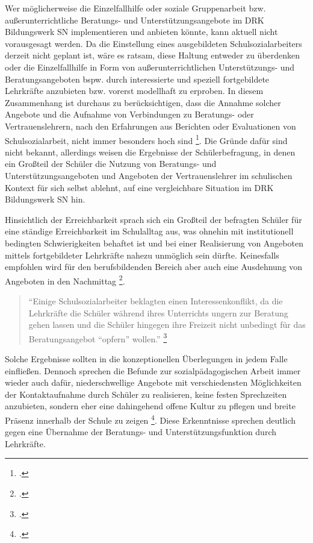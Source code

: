 Wer möglicherweise die Einzelfallhilfe oder soziale Gruppenarbeit bzw. außerunterrichtliche Beratungs- und Unterstützungsangebote im DRK Bildungswerk SN implementieren und anbieten könnte, kann aktuell nicht vorausgesagt werden. Da die Einstellung eines ausgebildeten Schulsozialarbeiters derzeit nicht geplant ist, wäre es ratsam, diese Haltung entweder zu überdenken oder die Einzelfallhilfe in Form von außerunterrichtlichen Unterstützungs- und Beratungsangeboten bspw. durch interessierte und speziell fortgebildete Lehrkräfte anzubieten bzw. vorerst modellhaft zu erproben. In diesem Zusammenhang ist durchaus zu berücksichtigen, dass die Annahme solcher Angebote und die Aufnahme von Verbindungen zu Beratungs- oder Vertrauenslehrern, nach den Erfahrungen aus Berichten oder Evaluationen von Schulsozialarbeit, nicht immer besonders hoch sind \footcite[vgl.][17f]{LSS2004}. Die Gründe dafür sind nicht bekannt, allerdings weisen die Ergebnisse der Schülerbefragung, in denen ein Großteil der Schüler die Nutzung von Beratungs- und Unterstützungsangeboten und Angeboten der Vertrauenslehrer im schulischen Kontext für sich selbst ablehnt, auf eine vergleichbare Situation im DRK Bildungswerk SN hin. 

Hinsichtlich der Erreichbarkeit sprach sich ein Großteil der  befragten Schüler für eine ständige Erreichbarkeit im Schulalltag aus, was ohnehin mit institutionell bedingten Schwierigkeiten behaftet ist und bei einer Realisierung von Angeboten mittels fortgebildeter Lehrkräfte nahezu unmöglich sein dürfte. Keinesfalls empfohlen wird für den berufsbildenden Bereich aber auch eine Ausdehnung von Angeboten in den  Nachmittag \footcite[vgl.][17f]{LSS2004}.

\begin{quotation}
\noindent
"`Einige Schulsozialarbeiter beklagten einen Interessenkonflikt, da die Lehrkräfte die Schüler während ihres Unterrichts ungern zur Beratung gehen lassen und die Schüler hingegen ihre Freizeit nicht unbedingt für das Beratungsangebot "`opfern"' wollen."' \footcite[93]{Ganser2004}
\end{quotation}

Solche Ergebnisse sollten in die konzeptionellen Überlegungen in jedem Falle einfließen. Dennoch sprechen die Befunde zur sozialpädagogischen Arbeit immer wieder auch dafür, niederschwellige Angebote mit verschiedensten Möglichkeiten der Kontaktaufnahme durch Schüler zu realisieren, keine festen Sprechzeiten anzubieten, sondern eher eine dahingehend offene Kultur zu pflegen und breite Präsenz innerhalb der Schule zu zeigen \footcite[vgl.][48]{Essers2012}. Diese Erkenntnisse sprechen deutlich gegen eine Übernahme der Beratungs- und Unterstützungsfunktion durch Lehrkräfte.
  
